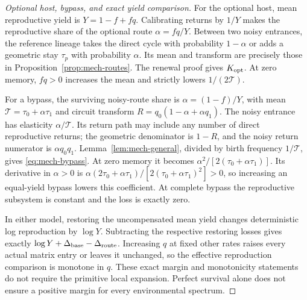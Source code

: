 \begin{proof}[Optional host, bypass, and exact yield comparison]
For the optional host, mean reproductive yield is \(Y=1-f+fq\). Calibrating returns by \(1/Y\) makes the reproductive share of the optional route \(\alpha=fq/Y\). Between two noisy entrances, the reference lineage takes the direct cycle with probability \(1-\alpha\) or adds a geometric stay \(\tau_p\) with probability \(\alpha\). Its mean and transform are precisely those in Proposition~\ref{prop:mech-routes}. The renewal proof gives \(K_{\rm opt}\). At zero memory, \(fq>0\) increases the mean and strictly lowers \(1/(2\mathcal T)\).

For a bypass, the surviving noisy-route share is \(\alpha=(1-f)/Y\), with mean \(\mathcal T=\tau_0+\alpha\tau_1\) and circuit transform \(R=q_0(1-\alpha+\alpha q_1)\). The noisy entrance has elasticity \(\alpha/\mathcal T\). Its return path may include any number of direct reproductive returns; the geometric denominator is \(1-R\), and the noisy return numerator is \(\alpha q_0q_1\). Lemma~\ref{lem:mech-general}, divided by birth frequency \(1/\mathcal T\), gives \eqref{eq:mech-bypass}. At zero memory it becomes \(\alpha^2/[2(\tau_0+\alpha\tau_1)]\). Its derivative in \(\alpha>0\) is
\(\alpha(2\tau_0+\alpha\tau_1)/[2(\tau_0+\alpha\tau_1)^2]>0\), so increasing an equal-yield bypass lowers this coefficient. At complete bypass the reproductive subsystem is constant and the loss is exactly zero.

In either model, restoring the uncompensated mean yield changes deterministic log reproduction by \(\log Y\). Subtracting the respective restoring losses gives exactly
\(\log Y+\Delta_{\rm base}-\Delta_{\rm route}\).
Increasing \(q\) at fixed other rates raises every actual matrix entry or leaves it unchanged, so the effective reproduction comparison is monotone in \(q\). These exact margin and monotonicity statements do not require the primitive local expansion. Perfect survival alone does not ensure a positive margin for every environmental spectrum.
\end{proof}

